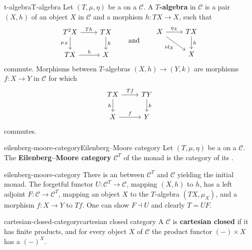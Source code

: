 \begin{topic}{t-algebra}{T-algebra}
    Let $(T, \mu, \eta)$ be a  on a  $\mathcal{C}$. A \textbf{$T$-algebra} in $\mathcal{C}$ is a pair $(X, h)$ of an object $X$ in $\mathcal{C}$ and a morphism $h : TX \to X$, such that
    \[ \begin{tikzcd} T^2 X \arrow[swap]{d}{\mu_X} \arrow{r}{Th} & TX \arrow{d}{h} \\ TX \arrow{r}{h} & X \end{tikzcd} \qquad \text{and} \qquad \begin{tikzcd} X \arrow[swap]{dr}{\id_X} \arrow{r}{\eta_X} & TX \arrow{d}{h} \\ & X \end{tikzcd} \]
    commute. Morphisms between $T$-algebras $(X, h) \to (Y, k)$ are morphisms $f : X \to Y$ in $\mathcal{C}$ for which
    \[ \begin{tikzcd} TX \arrow{r}{Tf} \arrow[swap]{d}{h} & TY \arrow{d}{k} \\ X \arrow{r}{f} & Y \end{tikzcd} \]
    commutes.
\end{topic}

\begin{topic}{eilenberg-moore-category}{Eilenberg--Moore category}
    Let $(T, \mu, \eta)$ be a  on a  $\mathcal{C}$. The \textbf{Eilenberg--Moore category} $\mathcal{C}^T$ of the monad is the category of its .
\end{topic}

\begin{example}{eilenberg-moore-category}
    There is an  between $\mathcal{C}^T$ and $\mathcal{C}$ yielding the initial monad. The forgetful functor $U : \mathcal{C}^T \to \mathcal{C}$, mapping $(X, h)$ to $h$, has a left adjoint $F : \mathcal{C} \to \mathcal{C}^T$, mapping an object $X$ to the $T$-algebra $(TX, \mu_X)$, and a morphism $f : X \to Y$ to $Tf$. One can show $F \dashv U$ and clearly $T = UF$.
\end{example}

\begin{topic}{cartesian-closed-category}{cartesian closed category}
    A  $\mathcal{C}$ is \textbf{cartesian closed} if it has finite products, and for every object $X$ of $\mathcal{C}$ the product functor $(-) \times X$ has a  $(-)^X$.
\end{topic}

